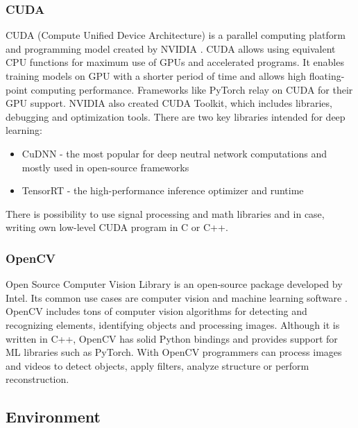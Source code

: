 \documentclass[../Main.tex]{subfiles}
\begin{document}
    \subsubsection{CUDA}
    CUDA (Compute Unified Device Architecture) is a parallel computing platform and programming model created by NVIDIA \cite{cudatoolkit}. CUDA allows using equivalent CPU functions for maximum use of GPUs and accelerated programs. It enables training models on GPU with a shorter period of time and allows high floating-point computing performance. Frameworks like PyTorch relay on CUDA for their GPU support. NVIDIA also created CUDA Toolkit, which includes libraries, debugging and optimization tools. There are two key libraries intended for deep learning: 
    \begin{itemize}
        \item CuDNN - the most popular for deep neutral network computations and mostly used in open-source frameworks
        \item TensorRT - the high-performance inference optimizer and runtime
    \end{itemize}
    
    There is possibility to use signal processing and math libraries and in case, writing own low-level CUDA program in C or C++. 

    \subsubsection{OpenCV}
    Open Source Computer Vision Library is an open-source package developed by Intel. Its common use cases are computer vision and machine learning software \cite{opencvdocs}. OpenCV includes tons of computer vision algorithms for detecting and recognizing elements, identifying objects and processing images. Although it is written in C++, OpenCV has solid Python bindings and provides support for ML libraries such as PyTorch. With OpenCV programmers can process images and videos to detect objects, apply filters, analyze structure or perform reconstruction. 
    
    
\subsection{Environment}
\end{document}
